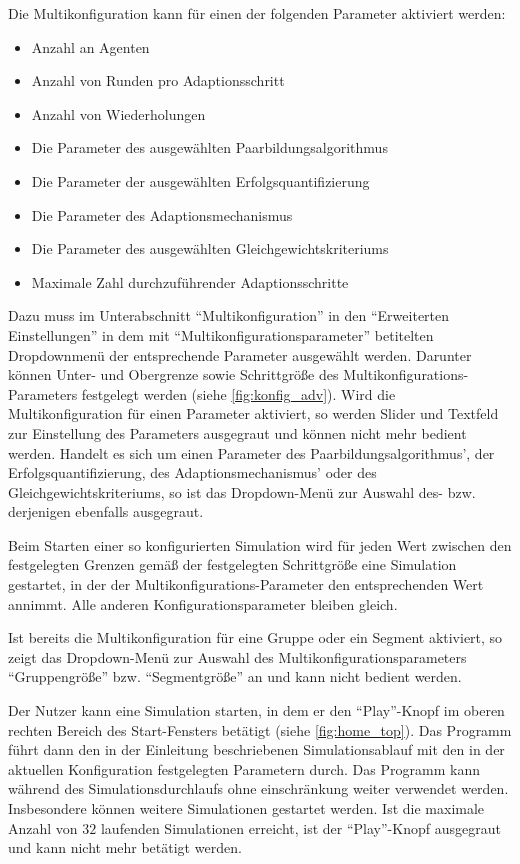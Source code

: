 \documentclass[parskip=full,11pt]{scrartcl}
\def\adapt{Adaptionsschritt}
\begin{document}
Die Multikonfiguration kann für einen der folgenden Parameter aktiviert werden:
\begin{itemize} \itemsep -10pt
\item Anzahl an Agenten
\item Anzahl von Runden pro \adapt
\item Anzahl von Wiederholungen
\item Die Parameter des ausgewählten Paarbildungsalgorithmus
\item Die Parameter der ausgewählten Erfolgsquantifizierung
\item Die Parameter des Adaptionsmechanismus 
\item Die Parameter des ausgewählten Gleichgewichtskriteriums
\item Maximale Zahl durchzuführender Adaptionsschritte
\end{itemize}
Dazu muss im Unterabschnitt \enquote{Multikonfiguration} in den \enquote{Erweiterten Einstellungen} in dem mit \enquote{Multikonfigurationsparameter} betitelten Dropdownmenü der entsprechende Parameter ausgewählt werden. Darunter können Unter- und Obergrenze sowie Schrittgröße des Multikonfigurations-Parameters festgelegt werden (siehe \cref{fig:konfig_adv}). Wird die Multikonfiguration für einen Parameter aktiviert, so werden Slider und Textfeld zur Einstellung des Parameters ausgegraut und können nicht mehr bedient werden. Handelt es sich um einen Parameter des Paarbildungsalgorithmus', der Erfolgsquantifizierung, des Adaptionsmechanismus' oder des Gleichgewichtskriteriums, so ist das Dropdown-Menü zur Auswahl des- bzw. derjenigen ebenfalls ausgegraut.

Beim Starten einer so konfigurierten Simulation wird für jeden Wert zwischen den festgelegten Grenzen gemäß der festgelegten Schrittgröße eine Simulation gestartet, in der der Multikonfigurations-Parameter den entsprechenden Wert annimmt. Alle anderen Konfigurationsparameter bleiben gleich.

Ist bereits die Multikonfiguration für eine Gruppe oder ein Segment aktiviert, so zeigt das Dropdown-Menü zur Auswahl des Multikonfigurationsparameters \enquote{Gruppengröße} bzw. \enquote{Segmentgröße} an und kann nicht bedient werden.

Der \Gls{Nutzer} kann eine Simulation starten, in dem er den \enquote{Play}-Knopf im oberen rechten Bereich des Start-Fensters betätigt (siehe \cref{fig:home_top}). Das Programm führt dann den in der Einleitung beschriebenen Simulationsablauf mit den in der aktuellen Konfiguration festgelegten Parametern durch. Das Programm kann während des Simulationsdurchlaufs ohne einschränkung weiter verwendet werden. Insbesondere können weitere Simulationen gestartet werden. Ist die maximale Anzahl von \(32\) laufenden Simulationen erreicht, ist der \enquote{Play}-Knopf ausgegraut und kann nicht mehr betätigt werden.
\end{document}
